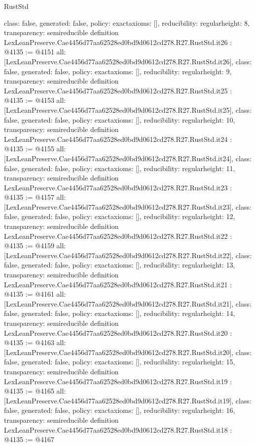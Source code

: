 \begin{lexlean}{RustStd}
\begin{coremodule}
{  class: false,
  generated: false,
  policy: exact{axioms: []},
  reducibility: regular{height: 8},
  transparency: semireducible
}
definition LexLeanPreserve.Cae4456d77aa62528ed0bd9d0612cd278.R27.RustStd.it26 : @4135 := @4151 {
  all: [LexLeanPreserve.Cae4456d77aa62528ed0bd9d0612cd278.R27.RustStd.it26],
  class: false,
  generated: false,
  policy: exact{axioms: []},
  reducibility: regular{height: 9},
  transparency: semireducible
}
definition LexLeanPreserve.Cae4456d77aa62528ed0bd9d0612cd278.R27.RustStd.it25 : @4135 := @4153 {
  all: [LexLeanPreserve.Cae4456d77aa62528ed0bd9d0612cd278.R27.RustStd.it25],
  class: false,
  generated: false,
  policy: exact{axioms: []},
  reducibility: regular{height: 10},
  transparency: semireducible
}
definition LexLeanPreserve.Cae4456d77aa62528ed0bd9d0612cd278.R27.RustStd.it24 : @4135 := @4155 {
  all: [LexLeanPreserve.Cae4456d77aa62528ed0bd9d0612cd278.R27.RustStd.it24],
  class: false,
  generated: false,
  policy: exact{axioms: []},
  reducibility: regular{height: 11},
  transparency: semireducible
}
definition LexLeanPreserve.Cae4456d77aa62528ed0bd9d0612cd278.R27.RustStd.it23 : @4135 := @4157 {
  all: [LexLeanPreserve.Cae4456d77aa62528ed0bd9d0612cd278.R27.RustStd.it23],
  class: false,
  generated: false,
  policy: exact{axioms: []},
  reducibility: regular{height: 12},
  transparency: semireducible
}
definition LexLeanPreserve.Cae4456d77aa62528ed0bd9d0612cd278.R27.RustStd.it22 : @4135 := @4159 {
  all: [LexLeanPreserve.Cae4456d77aa62528ed0bd9d0612cd278.R27.RustStd.it22],
  class: false,
  generated: false,
  policy: exact{axioms: []},
  reducibility: regular{height: 13},
  transparency: semireducible
}
definition LexLeanPreserve.Cae4456d77aa62528ed0bd9d0612cd278.R27.RustStd.it21 : @4135 := @4161 {
  all: [LexLeanPreserve.Cae4456d77aa62528ed0bd9d0612cd278.R27.RustStd.it21],
  class: false,
  generated: false,
  policy: exact{axioms: []},
  reducibility: regular{height: 14},
  transparency: semireducible
}
definition LexLeanPreserve.Cae4456d77aa62528ed0bd9d0612cd278.R27.RustStd.it20 : @4135 := @4163 {
  all: [LexLeanPreserve.Cae4456d77aa62528ed0bd9d0612cd278.R27.RustStd.it20],
  class: false,
  generated: false,
  policy: exact{axioms: []},
  reducibility: regular{height: 15},
  transparency: semireducible
}
definition LexLeanPreserve.Cae4456d77aa62528ed0bd9d0612cd278.R27.RustStd.it19 : @4135 := @4165 {
  all: [LexLeanPreserve.Cae4456d77aa62528ed0bd9d0612cd278.R27.RustStd.it19],
  class: false,
  generated: false,
  policy: exact{axioms: []},
  reducibility: regular{height: 16},
  transparency: semireducible
}
definition LexLeanPreserve.Cae4456d77aa62528ed0bd9d0612cd278.R27.RustStd.it18 : @4135 := @4167 {
}
\end{coremodule}
\end{lexlean}
